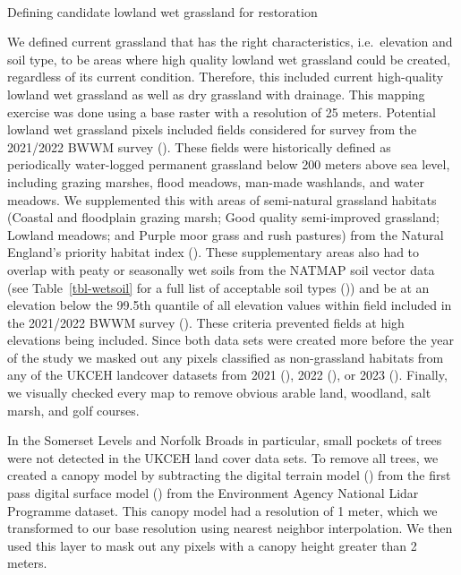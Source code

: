 \documentclass[
  12pt,
  letterpaper,
  DIV=11,
  numbers=noendperiod]{scrartcl}
\makeatletter
\let\oldparagraph\paragraph
\renewcommand{\paragraph}{
    \@ifstar
      \xxxParagraphStar
      \xxxParagraphNoStar
  }
\newcommand{\xxxParagraphStar}[1]{\oldparagraph*{#1}\mbox{}}
\newcommand{\xxxParagraphNoStar}[1]{\oldparagraph{#1}\mbox{}}
\makeatother
\begin{document}
\paragraph{Defining candidate lowland wet grassland for
restoration}\label{defining-candidate-lowland-wet-grassland-for-restoration}

We defined current grassland that has the right characteristics,
i.e.~elevation and soil type, to be areas where high quality lowland wet
grassland could be created, regardless of its current condition.
Therefore, this included current high-quality lowland wet grassland as
well as dry grassland with drainage. This mapping exercise was done
using a base raster with a resolution of 25 meters. Potential lowland
wet grassland pixels included fields considered for survey from the
2021/2022 BWWM survey (). These
fields were historically defined as periodically water-logged permanent
grassland below 200 meters above sea level, including grazing marshes,
flood meadows, man-made washlands, and water meadows. We supplemented
this with areas of semi-natural grassland habitats (Coastal and
floodplain grazing marsh; Good quality semi-improved grassland; Lowland
meadows; and Purple moor grass and rush pastures) from the Natural
England's priority habitat index (). These supplementary areas also had to overlap with peaty
or seasonally wet soils from the NATMAP soil vector data (see
Table~\ref{tbl-wetsoil} for a full list of acceptable soil types
()) and be at an elevation below the
99.5th quantile of all elevation values within field included in the
2021/2022 BWWM survey (). These
criteria prevented fields at high elevations being included. Since both
data sets were created more before the year of the study we masked out
any pixels classified as non-grassland habitats from any of the UKCEH
landcover datasets from 2021 (), 2022 (), or 2023
(). Finally, we visually
checked every map to remove obvious arable land, woodland, salt marsh,
and golf courses.

In the Somerset Levels and Norfolk Broads in particular, small pockets
of trees were not detected in the UKCEH land cover data sets. To remove
all trees, we created a canopy model by subtracting the digital terrain
model () from the
first pass digital surface model
() from the
Environment Agency National Lidar Programme dataset. This canopy model
had a resolution of 1 meter, which we transformed to our base resolution
using nearest neighbor interpolation. We then used this layer to mask
out any pixels with a canopy height greater than 2 meters.
\end{document}
